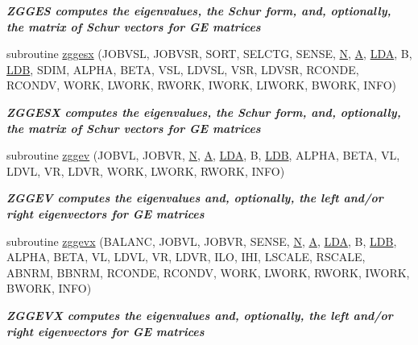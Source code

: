 \begin{DoxyCompactItemize}
\begin{DoxyCompactList}\small\item\em {\bfseries  Z\+G\+G\+E\+S computes the eigenvalues, the Schur form, and, optionally, the matrix of Schur vectors for G\+E matrices} \end{DoxyCompactList}\item 
subroutine \hyperlink{group__complex16GEeigen_ga73f44f731074e8f98990b89711bd60fa}{zggesx} (J\+O\+B\+V\+S\+L, J\+O\+B\+V\+S\+R, S\+O\+R\+T, S\+E\+L\+C\+T\+G, S\+E\+N\+S\+E, \hyperlink{polmisc_8c_a0240ac851181b84ac374872dc5434ee4}{N}, \hyperlink{classA}{A}, \hyperlink{example__user_8c_ae946da542ce0db94dced19b2ecefd1aa}{L\+D\+A}, B, \hyperlink{example__user_8c_a50e90a7104df172b5a89a06c47fcca04}{L\+D\+B}, S\+D\+I\+M, A\+L\+P\+H\+A, B\+E\+T\+A, V\+S\+L, L\+D\+V\+S\+L, V\+S\+R, L\+D\+V\+S\+R, R\+C\+O\+N\+D\+E, R\+C\+O\+N\+D\+V, W\+O\+R\+K, L\+W\+O\+R\+K, R\+W\+O\+R\+K, I\+W\+O\+R\+K, L\+I\+W\+O\+R\+K, B\+W\+O\+R\+K, I\+N\+F\+O)
\begin{DoxyCompactList}\small\item\em {\bfseries  Z\+G\+G\+E\+S\+X computes the eigenvalues, the Schur form, and, optionally, the matrix of Schur vectors for G\+E matrices} \end{DoxyCompactList}\item 
subroutine \hyperlink{group__complex16GEeigen_ga79fcce20c617429ccf985e6f123a6171}{zggev} (J\+O\+B\+V\+L, J\+O\+B\+V\+R, \hyperlink{polmisc_8c_a0240ac851181b84ac374872dc5434ee4}{N}, \hyperlink{classA}{A}, \hyperlink{example__user_8c_ae946da542ce0db94dced19b2ecefd1aa}{L\+D\+A}, B, \hyperlink{example__user_8c_a50e90a7104df172b5a89a06c47fcca04}{L\+D\+B}, A\+L\+P\+H\+A, B\+E\+T\+A, V\+L, L\+D\+V\+L, V\+R, L\+D\+V\+R, W\+O\+R\+K, L\+W\+O\+R\+K, R\+W\+O\+R\+K, I\+N\+F\+O)
\begin{DoxyCompactList}\small\item\em {\bfseries  Z\+G\+G\+E\+V computes the eigenvalues and, optionally, the left and/or right eigenvectors for G\+E matrices} \end{DoxyCompactList}\item 
subroutine \hyperlink{group__complex16GEeigen_gaad769423756706f1186027c9dd7615e4}{zggevx} (B\+A\+L\+A\+N\+C, J\+O\+B\+V\+L, J\+O\+B\+V\+R, S\+E\+N\+S\+E, \hyperlink{polmisc_8c_a0240ac851181b84ac374872dc5434ee4}{N}, \hyperlink{classA}{A}, \hyperlink{example__user_8c_ae946da542ce0db94dced19b2ecefd1aa}{L\+D\+A}, B, \hyperlink{example__user_8c_a50e90a7104df172b5a89a06c47fcca04}{L\+D\+B}, A\+L\+P\+H\+A, B\+E\+T\+A, V\+L, L\+D\+V\+L, V\+R, L\+D\+V\+R, I\+L\+O, I\+H\+I, L\+S\+C\+A\+L\+E, R\+S\+C\+A\+L\+E, A\+B\+N\+R\+M, B\+B\+N\+R\+M, R\+C\+O\+N\+D\+E, R\+C\+O\+N\+D\+V, W\+O\+R\+K, L\+W\+O\+R\+K, R\+W\+O\+R\+K, I\+W\+O\+R\+K, B\+W\+O\+R\+K, I\+N\+F\+O)
\begin{DoxyCompactList}\small\item\em {\bfseries  Z\+G\+G\+E\+V\+X computes the eigenvalues and, optionally, the left and/or right eigenvectors for G\+E matrices} \end{DoxyCompactList}\end{DoxyCompactItemize}


